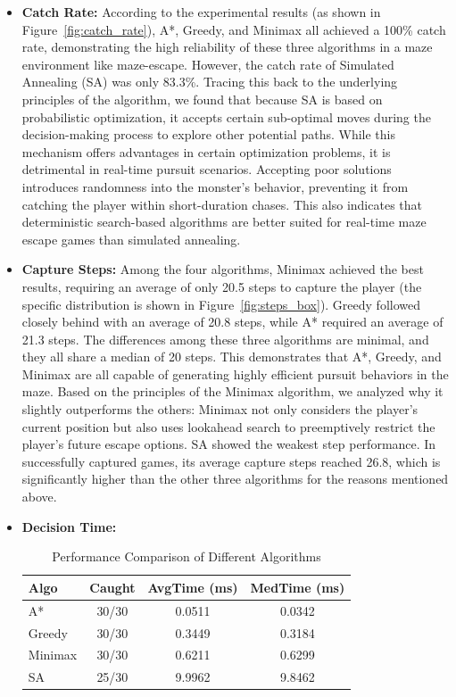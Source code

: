 \documentclass[12pt,a4paper]{article}
\begin{document}
\begin{itemize}
    \item \textbf{Catch Rate:} According to the experimental results (as shown in Figure~\ref{fig:catch_rate}), A*, Greedy, and Minimax all achieved a 100\% catch rate, demonstrating the high reliability of these three algorithms in a maze environment like maze-escape. However, the catch rate of Simulated Annealing (SA) was only 83.3\%. Tracing this back to the underlying principles of the algorithm, we found that because SA is based on probabilistic optimization, it accepts certain sub-optimal moves during the decision-making process to explore other potential paths. While this mechanism offers advantages in certain optimization problems, it is detrimental in real-time pursuit scenarios. Accepting poor solutions introduces randomness into the monster's behavior, preventing it from catching the player within short-duration chases. This also indicates that deterministic search-based algorithms are better suited for real-time maze escape games than simulated annealing.
    
    \item \textbf{Capture Steps:} Among the four algorithms, Minimax achieved the best results, requiring an average of only 20.5 steps to capture the player (the specific distribution is shown in Figure~\ref{fig:steps_box}). Greedy followed closely behind with an average of 20.8 steps, while A* required an average of 21.3 steps. The differences among these three algorithms are minimal, and they all share a median of 20 steps. This demonstrates that A*, Greedy, and Minimax are all capable of generating highly efficient pursuit behaviors in the maze. Based on the principles of the Minimax algorithm, we analyzed why it slightly outperforms the others: Minimax not only considers the player's current position but also uses lookahead search to preemptively restrict the player's future escape options. SA showed the weakest step performance. In successfully captured games, its average capture steps reached 26.8, which is significantly higher than the other three algorithms for the reasons mentioned above.
    
    \item \textbf{Decision Time:} 
\begin{table}[htbp]
    \centering
    \small
    \caption{Performance Comparison of Different Algorithms}
    \label{tab:algo_performance}
    \begin{tabular}{lccc}
        \toprule
        Algo & Caught & AvgTime (ms) & MedTime (ms) \\
        \midrule
        A* & 30/30 & 0.0511 & 0.0342 \\
        Greedy  & 30/30 & 0.3449 & 0.3184 \\
        Minimax & 30/30 & 0.6211 & 0.6299 \\
        SA      & 25/30 & 9.9962 & 9.8462 \\
        \bottomrule
    \end{tabular}
\end{table}


\end{itemize}
\end{document}
